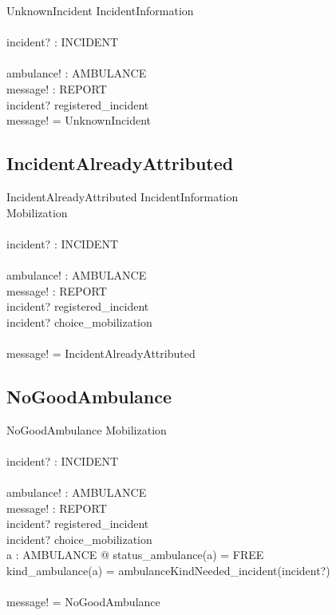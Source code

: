 \documentclass{report}
\begin{document}
\begin{schema}{UnknownIncident}
	\Xi IncidentInformation	\\
	\newline				\\
	incident? : INCIDENT	\\
	\newline				\\
	ambulance! : AMBULANCE	\\
	message! : REPORT		\\
  \where  
	incident? \notin registered\_incident \\
	message! = UnknownIncident
\end{schema}

\subsection{IncidentAlreadyAttributed}

\begin{schema}{IncidentAlreadyAttributed}
	\Xi IncidentInformation	\\
	\Xi Mobilization		\\
	\newline				\\
	incident? : INCIDENT	\\
	\newline				\\
	ambulance! : AMBULANCE	\\
	message! : REPORT		\\
  \where
  	incident? \in registered\_incident \\
  	incident? \in \ran choice\_mobilization \\
  	\newline \\
  	message! = IncidentAlreadyAttributed
\end{schema}
\newpage
\subsection{NoGoodAmbulance}

\begin{schema}{NoGoodAmbulance}
	\Xi Mobilization		\\
	\newline				\\
	incident? : INCIDENT	\\
	\newline				\\
	ambulance! : AMBULANCE	\\
	message! : REPORT		\\
  \where
	incident? \in registered\_incident \\
	incident? \notin \ran choice\_mobilization \\
	\not \exists a : AMBULANCE @ status\_ambulance(a) = FREE \land \\
	 kind\_ambulance(a) = ambulanceKindNeeded\_incident(incident?) \\
	\newline \\
	message! = NoGoodAmbulance
\end{schema}
\end{document}
